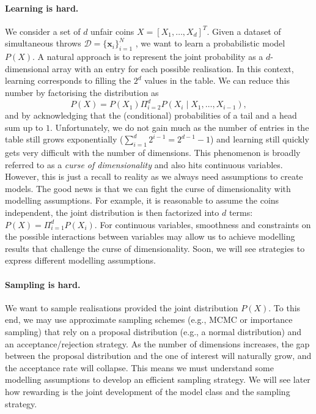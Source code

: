 \paragraph{Learning is hard.} We consider a set of $d$ unfair coins $X = \left[X_1, \dots, X_d \right]^T$. Given a dataset of simultaneous throws $\mathcal{D} = \{\bm{x}_i\}_{i=1}^N$ , we want to learn a probabilistic model $P(X)$. A natural approach is to represent the joint probability as a $d$-dimensional array with an entry for each possible realisation. In this context, learning corresponds to filling the $2^d$ values in the table. We can reduce this number by factorising the distribution as
$$P(X) = P(X_1)\Pi_{i=2}^d P(X_i\mid X_1, \dots, X_{i-1}),$$ and by acknowledging that the (conditional) probabilities of a tail and a head sum up to $1$. Unfortunately, we do not gain much as the number of entries in the table still grows exponentially ($\sum_{i=1}^d 2^{i-1} = 2^{d-1} - 1$) and learning still quickly gets very difficult with the number of dimensions. This phenomenon is broadly referred to as a \textit{curse of dimensionality} and also hits continuous variables. However, this is just a recall to reality as we always need assumptions to create models. The good news is that we can fight the curse of dimensionality with modelling assumptions. For example, it is reasonable to assume the coins independent, the joint distribution is then factorized into $d$ terms: $ P(X) = \Pi_{i=1}^d P(X_i)$. For continuous variables, smoothness and constraints on the possible interactions between variables may allow us to achieve modelling results that challenge the curse of dimensionality. Soon, we will see strategies to express different modelling assumptions.

\paragraph{Sampling is hard.} We want to sample realisations provided the joint distribution $P(X)$. To this end, we may use approximate sampling schemes (e.g., MCMC or importance sampling) that rely on a proposal distribution (e.g., a normal distribution) and an acceptance/rejection strategy. As the number of dimensions increases, the gap between the proposal distribution and the one of interest will naturally grow, and the acceptance rate will collapse. This means we must understand some modelling assumptions to develop an efficient sampling strategy. We will see later how rewarding is the joint development of the model class and the sampling strategy.

